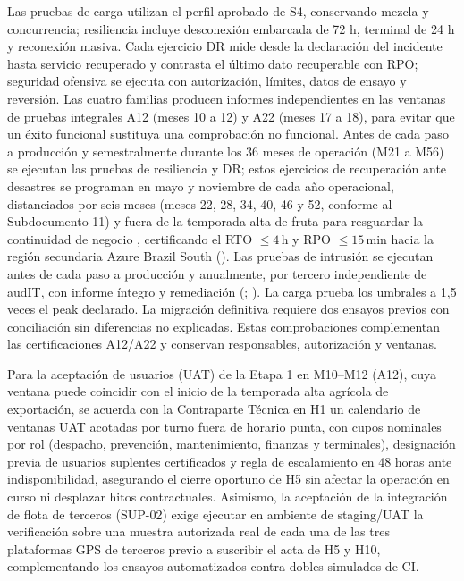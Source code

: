 Las pruebas de carga utilizan el perfil aprobado de S4, conservando mezcla y concurrencia; resiliencia incluye desconexión embarcada de 72 h, terminal de 24 h y reconexión masiva. Cada ejercicio DR mide desde la declaración del incidente hasta servicio recuperado y contrasta el último dato recuperable con RPO; seguridad ofensiva se ejecuta con autorización, límites, datos de ensayo y reversión. Las cuatro familias producen informes independientes en las ventanas de pruebas integrales A12 (meses 10 a 12) y A22 (meses 17 a 18), para evitar que un éxito funcional sustituya una comprobación no funcional. Antes de cada paso a producción y semestralmente durante los 36 meses de operación (M21 a M56) se ejecutan las pruebas de resiliencia y DR; estos ejercicios de recuperación ante desastres se programan en mayo y noviembre de cada año operacional, distanciados por seis meses (meses 22, 28, 34, 40, 46 y 52, conforme al Subdocumento 11) y fuera de la temporada alta de fruta para resguardar la continuidad de negocio , certificando el RTO $\le 4$\,h y RPO $\le 15$\,min hacia la región secundaria Azure Brazil South (). Las pruebas de intrusión se ejecutan antes de cada paso a producción y anualmente, por tercero independiente de audIT, con informe íntegro y remediación (; ). La carga prueba los umbrales a 1,5 veces el peak declarado. La migración definitiva requiere dos ensayos previos con conciliación sin diferencias no explicadas. Estas comprobaciones complementan las certificaciones A12/A22 y conservan responsables, autorización y ventanas.

Para la aceptación de usuarios (UAT) de la Etapa 1 en M10--M12 (A12), cuya ventana puede coincidir con el inicio de la temporada alta agrícola de exportación, se acuerda con la Contraparte Técnica en H1 un calendario de ventanas UAT acotadas por turno fuera de horario punta, con cupos nominales por rol (despacho, prevención, mantenimiento, finanzas y terminales), designación previa de usuarios suplentes certificados y regla de escalamiento en 48 horas ante indisponibilidad, asegurando el cierre oportuno de H5 sin afectar la operación en curso ni desplazar hitos contractuales. Asimismo, la aceptación de la integración de flota de terceros (SUP-02) exige ejecutar en ambiente de staging/UAT la verificación sobre una muestra autorizada real de cada una de las tres plataformas GPS de terceros previo a suscribir el acta de H5 y H10, complementando los ensayos automatizados contra dobles simulados de CI.

